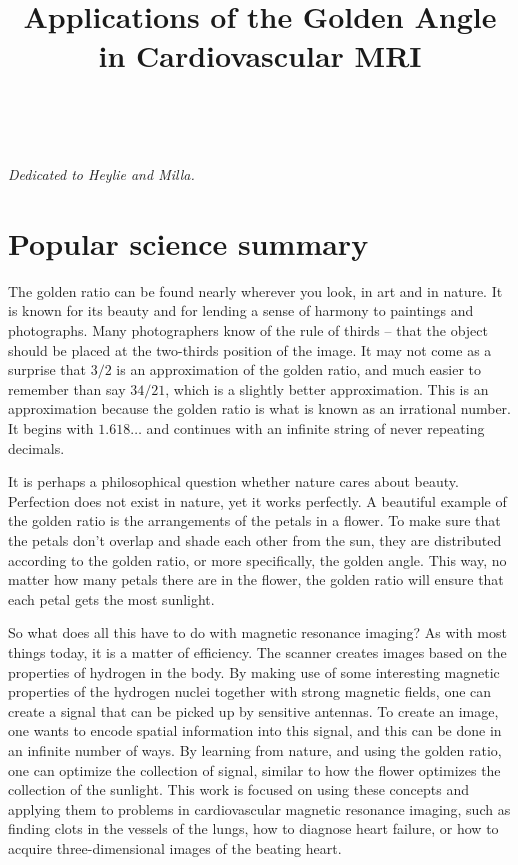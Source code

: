 \documentclass[11pt,twoside,openright]{book}
\title{Applications of the Golden Angle in Cardiovascular MRI}
\begin{document}
\thispagestyle{empty}

\cleardoublepage
\newpage
\thispagestyle{empty}
~
\vspace{140pt}
\begin{flushright}
\vfill
\textit{Dedicated to Heylie and Milla.}
\end{flushright}
\chapter*{Popular science summary}
\thispagestyle{empty}
The golden ratio can be found nearly wherever you look, in art and in nature. It is known for its beauty and for lending a sense of harmony to paintings and photographs. Many photographers know of the rule of thirds – that the object should be placed at the two-thirds position of the image. It may not come as a surprise that $3/2$ is an approximation of the golden ratio, and much easier to remember than say $34/21$, which is a slightly better approximation. This is an approximation because the golden ratio is what is known as an irrational number. It begins with $1.618\dots$ and continues with an infinite string of never repeating decimals.

It is perhaps a philosophical question whether nature cares about beauty. Perfection does not exist in nature, yet it works perfectly. A beautiful example of the golden ratio is the arrangements of the petals in a flower. To make sure that the petals don't overlap and shade each other from the sun, they are distributed according to the golden ratio, or more specifically, the golden angle. This way, no matter how many petals there are in the flower, the golden ratio will ensure that each petal gets the most sunlight.

So what does all this have to do with magnetic resonance imaging? As with most things today, it is a matter of efficiency. The scanner creates images based on the properties of hydrogen in the body. By making use of some interesting magnetic properties of the hydrogen nuclei together with strong magnetic fields, one can create a signal that can be picked up by sensitive antennas. To create an image, one wants to encode spatial information into this signal, and this can be done in an infinite number of ways. By learning from nature, and using the golden ratio, one can optimize the collection of signal, similar to how the flower optimizes the collection of the sunlight. This work is focused on using these concepts and applying them to problems in cardiovascular magnetic resonance imaging, such as finding clots in the vessels of the lungs, how to diagnose heart failure, or how to acquire three-dimensional images of the beating heart.
\end{document}
